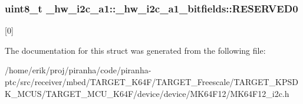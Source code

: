 \subsubsection[{\texorpdfstring{R\+E\+S\+E\+R\+V\+E\+D0}{RESERVED0}}]{\setlength{\rightskip}{0pt plus 5cm}uint8\+\_\+t \+\_\+hw\+\_\+i2c\+\_\+a1\+::\+\_\+hw\+\_\+i2c\+\_\+a1\+\_\+bitfields\+::\+R\+E\+S\+E\+R\+V\+E\+D0}\hypertarget{struct__hw__i2c__a1_1_1__hw__i2c__a1__bitfields_a2f54f4d7509c7a3f3c01f73c3d5db1f2}{}\label{struct__hw__i2c__a1_1_1__hw__i2c__a1__bitfields_a2f54f4d7509c7a3f3c01f73c3d5db1f2}
\mbox{[}0\mbox{]} 

The documentation for this struct was generated from the following file\+:\begin{DoxyCompactItemize}
\item 
/home/erik/proj/piranha/code/piranha-\/ptc/src/receiver/mbed/\+T\+A\+R\+G\+E\+T\+\_\+\+K64\+F/\+T\+A\+R\+G\+E\+T\+\_\+\+Freescale/\+T\+A\+R\+G\+E\+T\+\_\+\+K\+P\+S\+D\+K\+\_\+\+M\+C\+U\+S/\+T\+A\+R\+G\+E\+T\+\_\+\+M\+C\+U\+\_\+\+K64\+F/device/device/\+M\+K64\+F12/M\+K64\+F12\+\_\+i2c.\+h\end{DoxyCompactItemize}
